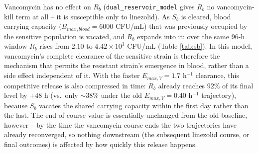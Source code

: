 \documentclass[11pt]{article}
\begin{document}
Vancomycin has no effect on $R_b$ (\texttt{dual\_reservoir\_model} gives
$R_b$ no vancomycin-kill term at all -- it is susceptible only to
linezolid). As $S_b$ is cleared, blood carrying capacity
($B_{max,blood} = 6000$ CFU/mL) that was previously occupied by the
sensitive population is vacated, and $R_b$ expands into it: over the same
96-h window $R_b$ rises from $2.10$ to $4.42\times10^{3}$ CFU/mL (Table
\ref{tab:sb}). In this model, vancomycin's complete clearance of the
sensitive strain is therefore the mechanism that permits the resistant
strain's emergence in blood, rather than a side effect independent of it.
With the faster $E_{max,V} = 1.7$ h$^{-1}$ clearance, this competitive
release is also compressed in time: $R_b$ already reaches $92\%$ of its
final level by $+48$ h (vs.\ only $\sim 38\%$ under the old $E_{max,V} =
0.40$ h$^{-1}$ trajectory), because $S_b$ vacates the shared carrying
capacity within the first day rather than the last. The end-of-course
value is essentially unchanged from the old baseline, however -- by the
time the vancomycin course ends the two trajectories have already
reconverged, so nothing downstream (the subsequent linezolid course, or
final outcomes) is affected by how quickly this release happens.
\end{document}
